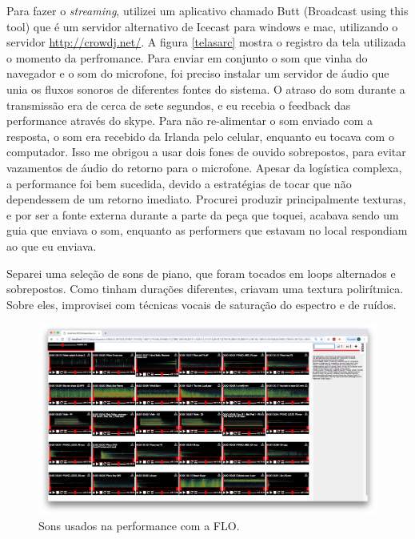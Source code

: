 Para fazer o \emph{streaming}, utilizei um aplicativo chamado Butt (Broadcast using this tool) que é um servidor alternativo de Icecast para windows e mac, utilizando o servidor \url{http://crowdj.net/}. A figura \ref{telasarc} mostra o registro da tela utilizada o momento da perfromance. Para enviar em conjunto o som que vinha do navegador e o som do microfone, foi preciso instalar um servidor de áudio que unia os fluxos sonoros de diferentes fontes do sistema. O atraso do som durante a transmissão era de cerca de sete segundos, e eu recebia o feedback das performance através do skype. Para não re-alimentar o som enviado com a resposta, o som era recebido da Irlanda pelo celular, enquanto eu tocava com o computador. Isso me obrigou a usar dois fones de ouvido sobrepostos, para evitar vazamentos de áudio do retorno para o microfone. Apesar da logística complexa, a performance foi bem sucedida, devido a estratégias de tocar que não dependessem de um retorno imediato. Procurei produzir principalmente texturas, e por ser a fonte externa durante a parte da peça que toquei, acabava sendo um guia que enviava o som, enquanto as performers que estavam no local respondiam ao que eu enviava. 

Separei uma seleção de sons de piano, que foram tocados em loops alternados e sobrepostos. Como tinham durações diferentes, criavam uma textura polirítmica. Sobre eles, improvisei com técnicas vocais de saturação do espectro e de ruídos.



\begin{figure}
\includegraphics[width=0.7\linewidth]{pictures/cap4/playsound_sarc}
\caption{Sons usados na performance com a FLO.}
\label{sonssarc}
\end{figure}




